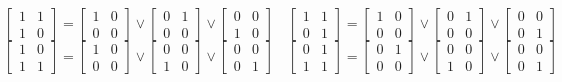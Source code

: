 \documentclass{article}
\begin{document}
$$
\begin{bmatrix}
    1 & 1\\
    1 & 0
\end{bmatrix}
=
\begin{bmatrix}
    1 & 0\\
    0 & 0
\end{bmatrix}
\lor
\begin{bmatrix}
    0 & 1\\
    0 & 0
\end{bmatrix}
\lor
\begin{bmatrix}
    0 & 0\\
    1 & 0
\end{bmatrix}
\quad 
\begin{bmatrix}
    1 & 1\\
    0 & 1
\end{bmatrix}
=
\begin{bmatrix}
    1 & 0\\
    0 & 0
\end{bmatrix}
\lor
\begin{bmatrix}
    0 & 1\\
    0 & 0
\end{bmatrix}
\lor
\begin{bmatrix}
    0 & 0\\
    0 & 1
\end{bmatrix}
$$
$$
\begin{bmatrix}
    1 & 0\\
    1 & 1
\end{bmatrix}
=
\begin{bmatrix}
    1 & 0\\
    0 & 0
\end{bmatrix}
\lor
\begin{bmatrix}
    0 & 0\\
    1 & 0
\end{bmatrix}
\lor
\begin{bmatrix}
    0 & 0\\
    0 & 1
\end{bmatrix}
\quad 
\begin{bmatrix}
    0 & 1\\
    1 & 1
\end{bmatrix}
=
\begin{bmatrix}
    0 & 1\\
    0 & 0
\end{bmatrix}
\lor
\begin{bmatrix}
    0 & 0\\
    1 & 0
\end{bmatrix}
\lor
\begin{bmatrix}
    0 & 0\\
    0 & 1
\end{bmatrix}
$$
\end{document}
